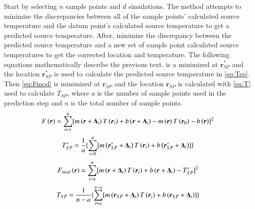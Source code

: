 \documentclass[preprint,12pt]{elsarticle}
\newcommand{\bv}[1]{\boldsymbol #1}  %
\begin{document}
Start by selecting $n$ sample points and $d$ simulations.  The method attempts to minimize the discrepancies between all of the sample points' calculated source temperature and the datum point's calculated source temperature to get a predicted source temperature.  After, minimize the discrepancy between the predicted source temperature and a new set of sample point calculated source temperatures to get the corrected location and temperature.  The following equations mathematically describe the previous text.   is a minimized at $\bv{r^{\ast}_{SP}}$ and the location $\bv{r^{\ast}_{SP}}$ is used to calculate the predicted source temperature in \cref{eq:Tsp}.  Then \cref{eq:Fmod} is minimized at $\bv{r_{SP}}$ and the location $\bv{r_{SP}}$ is calculated with \cref{eq:T} used to calculate $T_{SP}$, where $a$ is the number of sample points used in the prediction step and $n$ is the total number of sample points.
\begin{equation}
\centering
F\left( \bv r \right) =  \sum^{a}_{i=1} [ m\left( \bv r + \bv{\Delta_i}  \right) T\left( \bv{r_i} \right) +b\left( \bv r + \bv{\Delta_i} \right) -m\left( \bv r \right) T\left( \bv{r_0} \right) - b\left( \bv r \right) ]^2  
\label{eq:F}
\end{equation}
%
\begin{equation}
\centering
T^{\ast}_{SP} = \frac{1}{a} \{ \sum^{a}_{i=0} [ m\left( \bv{r^{\ast}_{SP}}+ \bv{\Delta_i}  \right) T\left( \bv{r_i} \right)  + b\left( \bv{r^{\ast}_{SP}}+ \bv{\Delta_i} \right) ] \}
\label{eq:Tsp}
\end{equation}
%
\begin{equation}
\centering
F_{mod}\left( \bv r \right) = \sum^{n}_{i=a} [ m\left( \bv r +\bv{\Delta_i} \right) T\left( \bv{r_i} \right) + b\left( \bv r + \bv{\Delta_i} \right)-T^{\ast}_{SP} ]^2
\label{eq:Fmod}
\end{equation}
%
\begin{equation}
\centering
T_{SP} = \frac{1}{n-a} \{ \sum^{n-a}_{i=a} [ m\left( \bv{r_{SP}}+ \bv{\Delta_i} \right) T\left( \bv{r_i}\right)  + b\left( \bv{r_{SP}}+ \bv{\Delta_i}  \right) ] \}
\label{eq:T}
\end{equation}
\end{document}
